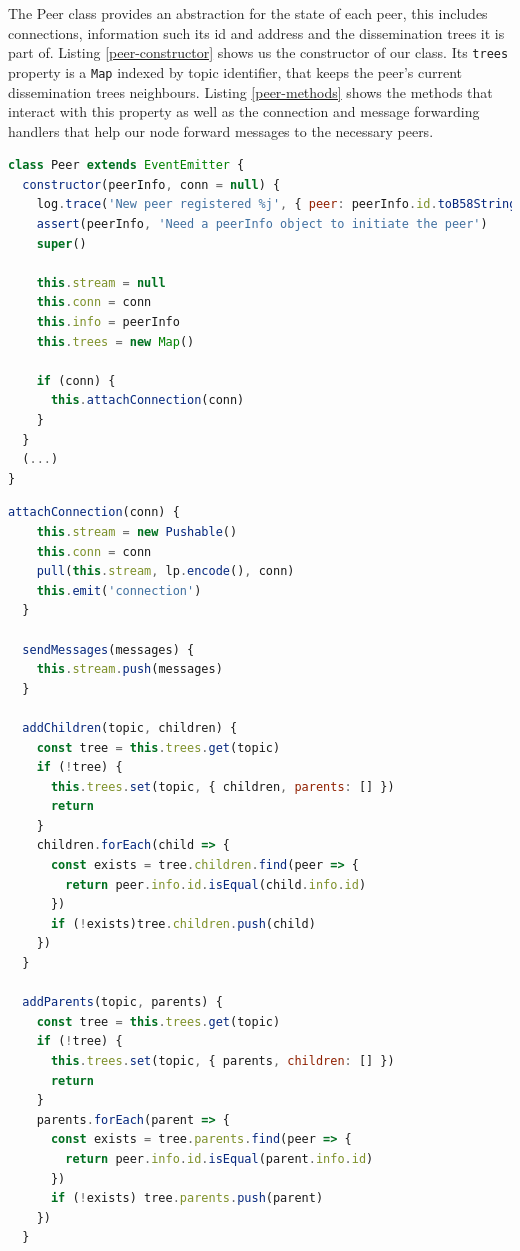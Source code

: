 The Peer class provides an abstraction for the state of each peer, this
includes connections, information such its id and address and the dissemination
trees it is part of. Listing \ref{peer-constructor} shows us the constructor of
our class. Its \verb|trees| property is a \verb|Map| indexed by topic
identifier, that keeps the peer's current dissemination trees neighbours.
Listing \ref{peer-methods} shows the methods that interact with this property
as well as the connection and message forwarding handlers that help our node
forward messages to the necessary peers.

\begin{lstlisting}[language=JavaScript, float=p, caption={Peer class constructor},label={peer-constructor}]
class Peer extends EventEmitter {
  constructor(peerInfo, conn = null) {
    log.trace('New peer registered %j', { peer: peerInfo.id.toB58String() })
    assert(peerInfo, 'Need a peerInfo object to initiate the peer')
    super()

    this.stream = null
    this.conn = conn
    this.info = peerInfo
    this.trees = new Map()

    if (conn) {
      this.attachConnection(conn)
    }
  }
  (...)
}
\end{lstlisting}

\begin{lstlisting}[language=JavaScript, float=p, caption={Peer class relevant methods},label={peer-methods}]
  attachConnection(conn) {
    this.stream = new Pushable()
    this.conn = conn
    pull(this.stream, lp.encode(), conn)
    this.emit('connection')
  }

  sendMessages(messages) {
    this.stream.push(messages)
  }

  addChildren(topic, children) {
    const tree = this.trees.get(topic)
    if (!tree) {
      this.trees.set(topic, { children, parents: [] })
      return
    }
    children.forEach(child => {
      const exists = tree.children.find(peer => {
        return peer.info.id.isEqual(child.info.id)
      })
      if (!exists)tree.children.push(child)
    })
  }

  addParents(topic, parents) {
    const tree = this.trees.get(topic)
    if (!tree) {
      this.trees.set(topic, { parents, children: [] })
      return
    }
    parents.forEach(parent => {
      const exists = tree.parents.find(peer => {
        return peer.info.id.isEqual(parent.info.id)
      })
      if (!exists) tree.parents.push(parent)
    })
  }
\end{lstlisting}

